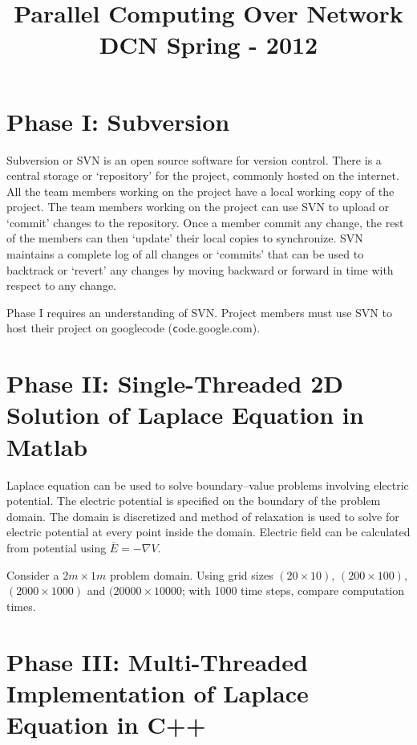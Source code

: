 \documentclass{article}
\begin{document}
\title{Parallel Computing Over Network\\DCN Spring - 2012}
\maketitle

\section{Phase I: Subversion}

Subversion or SVN is an open source software for version control. There is a central storage or `repository' for the project, commonly hosted on the internet. All the team members working on the project have a local working copy of the project. The team members working on the project can use SVN to upload or `commit' changes to the repository. Once a member commit any change, the rest of the members can then `update' their local copies to synchronize. SVN maintains a complete log of all changes or `commits' that can be used to backtrack or `revert' any changes by moving backward or forward in time with respect to any change.

Phase I requires an understanding of SVN. Project members must use SVN to host their project on googlecode ({\texttt code.google.com}).

\section{Phase II: Single-Threaded 2D Solution of Laplace Equation in Matlab}

Laplace equation can be used to solve boundary--value problems involving electric potential. The electric potential is specified on the boundary of the problem domain. The domain is discretized and method of relaxation is used to solve for electric potential at every point inside the domain. Electric field can be calculated from potential using $\overline{E}=-\nabla V$.

Consider a $2m \times 1m$ problem domain. Using grid sizes $(20 \times 10)$, $(200 \times 100)$, $(2000 \times 1000)$ and $(20000 \times 10000$; with 1000 time steps, compare computation times.

\section{Phase III: Multi-Threaded Implementation of Laplace Equation in C++}
\end{document}
